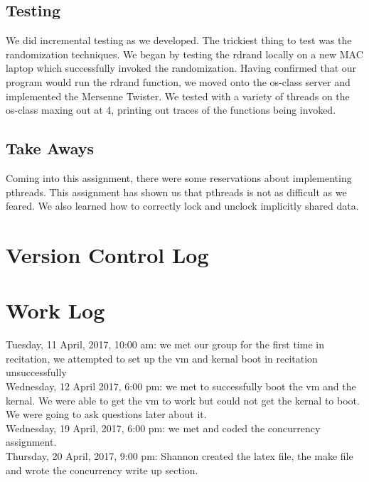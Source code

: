 \documentclass[letterpaper,10pt,serif,draftclsnofoot,onecolumn,compsoc,titlepage]{article}%
\begin{document}
\subsection{Testing}
We did incremental testing as we developed. The trickiest thing to test was 
the randomization techniques. We began by testing the rdrand locally on a 
new MAC laptop which successfully invoked the randomization. Having 
confirmed that our program would run the rdrand function, we moved onto 
the os-class server and implemented the Mersenne Twister. We tested with a 
variety of threads on the os-class maxing out at 4, printing out traces of 
the functions being invoked. 
\subsection{Take Aways}
Coming into this assignment, there were some reservations about implementing
 pthreads. This assignment has shown us that pthreads is not as difficult as
 we feared. We also learned how to correctly lock and unclock implicitly 
 shared data. 
\section{Version Control Log}
\section{Work Log}
Tuesday, 11 April, 2017, 10:00 am: we met our group for the first time in
 recitation, we attempted to set up the vm and kernal boot in recitation
  unsuccessfully \\
Wednesday, 12 April 2017, 6:00 pm: we met to successfully boot the vm and 
the kernal. We were able to get the vm to work but could not get the kernal 
to boot. We were going to ask questions later about it.\\
Wednesday, 19 April, 2017, 6:00 pm: we met and coded the concurrency 
assignment.\\ 
Thursday, 20 April, 2017, 9:00 pm: Shannon created the latex file, the 
make file and wrote the concurrency write up section. 
\end{document}
